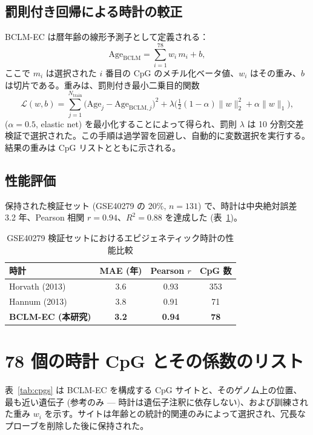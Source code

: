 \documentclass[12pt,a4paper]{ltjsarticle}
\begin{document}
	\subsection{罰則付き回帰による時計の較正}
	BCLM-EC は暦年齢の線形予測子として定義される：
	\begin{equation}
		\mathrm{Age}_{\mathrm{BCLM}} = \sum_{i=1}^{78} w_i \, m_i + b,
		\label{eq:clock}
	\end{equation}
	ここで \(m_i\) は選択された \(i\) 番目の CpG のメチル化ベータ値、\(w_i\) はその重み、\(b\) は切片である。重みは、罰則付き最小二乗目的関数
	\[
	\mathcal{L}(w,b) = \sum_{j=1}^{N_{\mathrm{train}}} \bigl( \mathrm{Age}_j - \mathrm{Age}_{\mathrm{BCLM},j} \bigr)^2 + \lambda \bigl( \tfrac{1}{2}(1-\alpha)\|w\|_2^2 + \alpha\|w\|_1 \bigr),
	\]
	(\(\alpha=0.5\), elastic net) を最小化することによって得られ、罰則 \(\lambda\) は 10 分割交差検証で選択された。この手順は過学習を回避し、自動的に変数選択を実行する。結果の重みは CpG リストとともに示される。
	
	\subsection{性能評価}
	保持された検証セット (GSE40279 の 20\%, \(n=131\)) で、時計は中央絶対誤差 3.2 年、Pearson 相関 \(r=0.94\)、\(R^2=0.88\) を達成した (表~\ref{tab:clock-comparison})。
	
	\begin{table}[H]
		\centering
		\caption{GSE40279 検証セットにおけるエピジェネティック時計の性能比較}
		\label{tab:clock-comparison}
		\begin{tabular}{lccc}
			\toprule
			\textbf{時計} & \textbf{MAE (年)} & \textbf{Pearson \(r\)} & \textbf{CpG 数} \\
			\midrule
			Horvath (2013) & 3.6 & 0.93 & 353 \\
			Hannum (2013)\footnotemark & 3.8 & 0.91 & 71 \\
			\textbf{BCLM-EC (本研究)} & \textbf{3.2} & \textbf{0.94} & \textbf{78} \\
			\bottomrule
		\end{tabular}
	\end{table}
	
	\section{78 個の時計 CpG とその係数のリスト}
	\label{sec:cpgs}
	表~\ref{tab:cpgs} は BCLM-EC を構成する CpG サイトと、そのゲノム上の位置、最も近い遺伝子 (参考のみ — 時計は遺伝子注釈に依存しない)、および訓練された重み \(w_i\) を示す。サイトは年齢との統計的関連のみによって選択され、冗長なプローブを削除した後に保持された。
	
\end{document}
